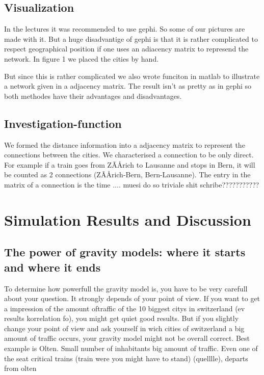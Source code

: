 \documentclass[11pt]{article}
\begin{document}
\subsection{Visualization}
In the lectures it was recommended to use gephi. So some of our pictures are made with it. But a huge disadvantige of gephi is that it is rather complicated to respect geographical position if one uses an adiacency  matrix to represend the network. In figure 1 we placed the cities by hand.

But since this is rather complicated we also wrote funciton in matlab to illustrate a network given in a adjacency matrix. The result isn't as pretty as in gephi so both methodes have their advantages and disadvantages.

\subsection{Investigation-function}




We formed the distance information into a adjacency matrix to represent the connections between the cities.  We characterised a connection to be only direct. For example if a train goes from ZÃÅrich to Lausanne and stops in Bern, it will be counted as 2 connections (ZÃÅrich-Bern, Bern-Lausanne). The entry in the matrix of a connection is the time .... muesi do so triviale shit schribe???????????




\section{Simulation Results and Discussion}

\subsection{The power of gravity models: where it starts and where it ends}

To determine how powerfull the gravity model is, you have to be very carefull about your question. It strongly depends of your point of view. If you want to get a impression of the amount oftraffic of the 10 biggest citys in switzerland (ev results korrelation fo), you might get quiet good results. But if you slightly change your point of view and ask yourself in wich cities of switzerland a big amount of traffic occurs, your gravity model might not be overall correct. Best example is Olten. Small number of inhabitants big amount of traffic. Even one of the seat critical trains (train were you might have to stand) (quelllle), departs from olten
\end{document}

